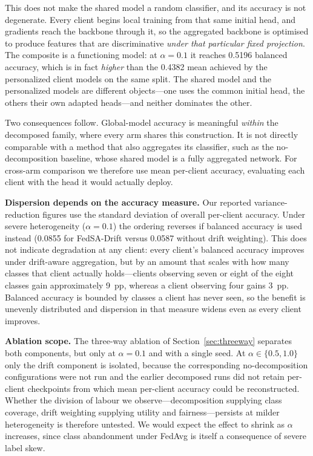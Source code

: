 \documentclass[utf8]{FrontiersinHarvard} %
\newcommand{\sadrift}{FedSA-Drift}
\begin{document}
This does not make the shared model a random classifier, and its accuracy is not degenerate. Every client begins local training from that same initial head, and gradients reach the backbone through it, so the aggregated backbone is optimised to produce features that are discriminative \emph{under that particular fixed projection}. The composite is a functioning model: at $\alpha{=}0.1$ it reaches 0.5196 balanced accuracy, which is in fact \emph{higher} than the 0.4382 mean achieved by the personalized client models on the same split. The shared model and the personalized models are different objects---one uses the common initial head, the others their own adapted heads---and neither dominates the other.

Two consequences follow. Global-model accuracy is meaningful \emph{within} the decomposed family, where every arm shares this construction. It is not directly comparable with a method that also aggregates its classifier, such as the no-decomposition baseline, whose shared model is a fully aggregated network. For cross-arm comparison we therefore use mean per-client accuracy, evaluating each client with the head it would actually deploy.

\textbf{Dispersion depends on the accuracy measure.} Our reported variance-reduction figures use the standard deviation of overall per-client accuracy. Under severe heterogeneity ($\alpha = 0.1$) the ordering reverses if balanced accuracy is used instead (0.0855 for \sadrift{} versus 0.0587 without drift weighting). This does not indicate degradation at any client: every client's balanced accuracy improves under drift-aware aggregation, but by an amount that scales with how many classes that client actually holds---clients observing seven or eight of the eight classes gain approximately 9~pp, whereas a client observing four gains 3~pp. Balanced accuracy is bounded by classes a client has never seen, so the benefit is unevenly distributed and dispersion in that measure widens even as every client improves.

\textbf{Ablation scope.} The three-way ablation of Section~\ref{sec:threeway} separates both components, but only at $\alpha = 0.1$ and with a single seed. At $\alpha \in \{0.5, 1.0\}$ only the drift component is isolated, because the corresponding no-decomposition configurations were not run and the earlier decomposed runs did not retain per-client checkpoints from which mean per-client accuracy could be reconstructed. Whether the division of labour we observe---decomposition supplying class coverage, drift weighting supplying utility and fairness---persists at milder heterogeneity is therefore untested. We would expect the effect to shrink as $\alpha$ increases, since class abandonment under FedAvg is itself a consequence of severe label skew.
\end{document}
